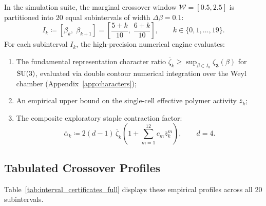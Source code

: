 In the simulation suite, the marginal crossover window $\mathcal{W} = [0.5, 2.5]$ is partitioned into 20 equal subintervals of width $\Delta\beta = 0.1$:
\begin{equation}
\label{eq:subinterval_ik_def}
I_k \coloneqq \left[ \beta_k, \; \beta_{k+1} \right] = \left[ \frac{5 + k}{10}, \; \frac{6 + k}{10} \right], \qquad k \in \{0, 1, \dots, 19\}.
\end{equation}
For each subinterval $I_k$, the high-precision numerical engine evaluates:
\begin{enumerate}
    \item The fundamental representation character ratio $\overline{\zeta}_k \ge \sup_{\beta \in I_k} \zeta_{\mathbf{3}}(\beta)$ for $\mathrm{SU}(3)$, evaluated via double contour numerical integration over the Weyl chamber (Appendix~\ref{app:characters});
    \item An empirical upper bound on the single-cell effective polymer activity $\overline{z}_k$;
    \item The composite exploratory staple contraction factor:
    \begin{equation}
    \label{eq:staple_contraction_factor_app}
    \overline{\alpha}_k \coloneqq 2(d - 1) \, \overline{\zeta}_k \left( 1 + \sum_{m=1}^{12} c_m \overline{z}_k^m \right), \qquad d = 4.
    \end{equation}
\end{enumerate}

\subsection{Tabulated Crossover Profiles}
\label{subsec:tabulated_profiles}

Table~\ref{tab:interval_certificates_full} displays these empirical profiles across all 20 subintervals.

